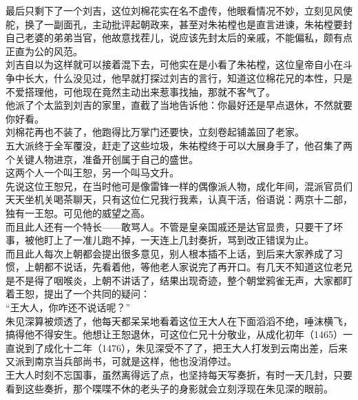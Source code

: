 \begin{multicols}{\theparacolNo}
最后只剩下了一个刘吉，这位刘棉花实在名不虚传，他眼看情况不妙，立刻见风使舵，换了一副面孔，主动批评起朝政来，甚至对朱祐樘也是直言进谏，朱祐樘要封自己老婆的弟弟当官，他故意找茬儿，说应该先封太后的亲戚，不能偏私，颇有点正直为公的风范。\\

刘吉自以为这样就可以接着混下去，可他实在是小看了朱祐樘，这位皇帝自小在斗争中长大，什么没见过，他早就打探过刘吉的言行，知道这位棉花兄的本性，只是不爱搭理他，可他现在竟然主动出来惹事找抽，那就不客气了。\\

他派了个太监到刘吉的家里，直截了当地告诉他：你最好还是早点退休，不然就要你好看。\\

刘棉花再也不装了，他跑得比万掌门还要快，立刻卷起铺盖回了老家。\\

五大派终于全军覆没，赶走了这些垃圾，朱祐樘终于可以大展身手了，他召集了两个关键人物进京，准备开创属于自己的盛世。\\

这两个人一个叫王恕，另一个叫马文升。\\

先说这位王恕兄，在当时他可是像雷锋一样的偶像派人物，成化年间，混派官员们天天坐机关喝茶聊天，只有这位仁兄我行我素，认真干活，俗语说：两京十二部，独有一王恕。可见他的威望之高。\\

而且此人还有一个特长——敢骂人。不管是皇亲国戚还是达官显贵，只要干了坏事，被他盯上了一准儿跑不掉，一天连上几封奏折，骂到改正错误为止。\\

而且此人每次上朝都会提出很多意见，别人根本插不上话，到后来大家养成了习惯，上朝都不说话，先看着他，等他老人家说完了再开口。有几天不知道这位老兄是不是得了咽喉炎，上朝不讲话了，结果出现奇迹，整个朝堂鸦雀无声，大家都盯着王恕，提出了一个共同的疑问：\\

“王大人，你咋还不说话呢？”\\

朱见深算被烦透了，他每天都呆呆地看着这位王大人在下面滔滔不绝，唾沫横飞，搞得他不得安生。他想让王恕退休，可这位仁兄十分敬业，从成化初年（1465）一直说到了成化十二年（1476），朱见深受不了了，把王大人打发到云南出差，后来又派到南京当兵部尚书，可就是这样，他也没消停过。\\

王大人时刻不忘国事，虽然离得远了点，也坚持每天写奏折，有时一天几封，只要看到这些奏折，那个喋喋不休的老头子的身影就会立刻浮现在朱见深的眼前。\\


\end{multicols}
